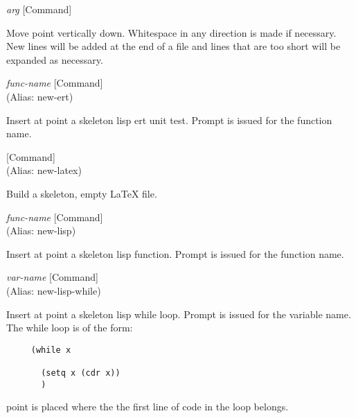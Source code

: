 \vspace{1em}
\noindent
{}
\usebox{\funcname}\emph{arg}
 \hfill [Command]

\begin{doc-string}
Move point vertically down.  Whitespace in any direction is made if
necessary.  New lines will be added at the end of a file and lines that are
too short will be expanded as necessary.
\end{doc-string}

\vspace{1em}
\noindent
{}
\usebox{\funcname}\emph{func-name}
 \hfill [Command]\\%
 (Alias: new-ert)

\begin{doc-string}
Insert at point a skeleton lisp ert unit test.  Prompt is issued for the
function name.
\end{doc-string}

\vspace{1em}
\noindent
{}
\usebox{\funcname}
 \hfill [Command]\\%
 (Alias: new-latex)

\begin{doc-string}
Build a skeleton, empty LaTeX file.
\end{doc-string}

\vspace{1em}
\noindent
{}
\usebox{\funcname}\emph{func-name}
 \hfill [Command]\\%
 (Alias: new-lisp)

\begin{doc-string}
Insert at point a skeleton lisp function.  Prompt is issued for the function
name.
\end{doc-string}

\vspace{1em}
\noindent
{}
\usebox{\funcname}\emph{var-name}
 \hfill [Command]\\%
 (Alias: new-lisp-while)

\begin{doc-string}
Insert at point a skeleton lisp while loop.  Prompt is issued for the
variable name.  The while loop is of the form:

\small{\begin{verbatim}
     (while x

       (setq x (cdr x))
       )
\end{verbatim}}
point is placed where the the first line of code in the loop belongs.
\end{doc-string}

